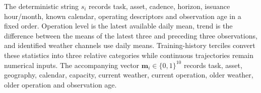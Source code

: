 \documentclass[journal]{IEEEtran}
\begin{document}
%
%
%
The deterministic string $s_i$ records task, asset, cadence, horizon, issuance hour/month, known calendar, operating descriptors and observation age in a fixed order. Operation level is the latest available daily mean, trend is the difference between the means of the latest three and preceding three observations, and identified weather channels use daily means. Training-history terciles convert these statistics into three relative categories while continuous trajectories remain numerical inputs. The accompanying vector $\mathbf m_i\in\{0,1\}^{10}$ records task, asset, geography, calendar, capacity, current weather, current operation, older weather, older operation and observation age.
\end{document}
